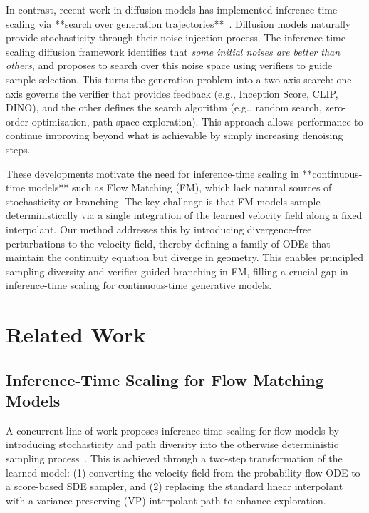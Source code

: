 \documentclass{article}
\begin{document}
In contrast, recent work in diffusion models has implemented inference-time scaling via **search over generation trajectories**~\cite{ma2025diffits}. Diffusion models naturally provide stochasticity through their noise-injection process. The inference-time scaling diffusion framework identifies that \emph{some initial noises are better than others}, and proposes to search over this noise space using verifiers to guide sample selection. This turns the generation problem into a two-axis search: one axis governs the verifier that provides feedback (e.g., Inception Score, CLIP, DINO), and the other defines the search algorithm (e.g., random search, zero-order optimization, path-space exploration). This approach allows performance to continue improving beyond what is achievable by simply increasing denoising steps.

These developments motivate the need for inference-time scaling in **continuous-time models** such as Flow Matching (FM), which lack natural sources of stochasticity or branching. The key challenge is that FM models sample deterministically via a single integration of the learned velocity field along a fixed interpolant. Our method addresses this by introducing divergence-free perturbations to the velocity field, thereby defining a family of ODEs that maintain the continuity equation but diverge in geometry. This enables principled sampling diversity and verifier-guided branching in FM, filling a crucial gap in inference-time scaling for continuous-time generative models.


\section{Related Work}
\label{sec:related}

\subsection{Inference-Time Scaling for Flow Matching Models}

A concurrent line of work proposes inference-time scaling for flow models by introducing stochasticity and path diversity into the otherwise deterministic sampling process~\cite{kim2025flowits}. This is achieved through a two-step transformation of the learned model: (1) converting the velocity field from the probability flow ODE to a score-based SDE sampler, and (2) replacing the standard linear interpolant with a variance-preserving (VP) interpolant path to enhance exploration.
\end{document}
